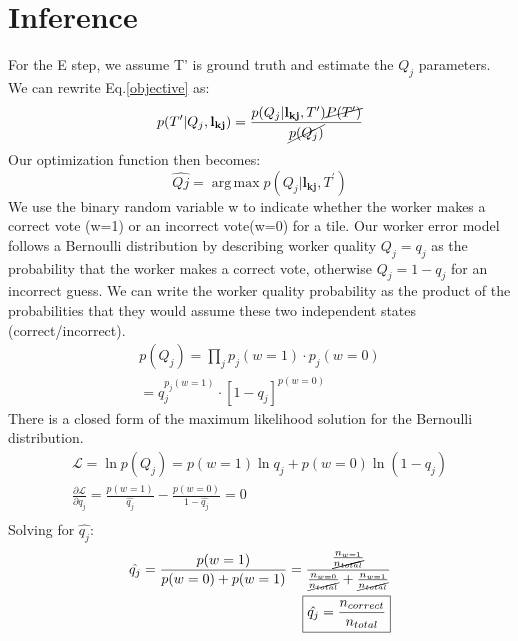 \documentclass[12pt]{article}
\DeclareMathOperator*{\argmax}{arg\,max}
\begin{document}
\section{Inference}
\par For the E step, we assume T' is ground truth and estimate the $Q_j$ parameters. We can rewrite Eq.\ref{objective} as: 
\begin{equation}
p(T^\prime| Q_j,\mathbf{l_{kj}})
=\frac{p(Q_j| \mathbf{l_{kj}},T^\prime)\cancel{P(T^\prime)}}{\cancel{p(Q_j)}}
\end{equation}
Our optimization function then becomes: 
\begin{equation}
\hat{Qj} = \argmax p(Q_j| \mathbf{l_{kj}},T^\prime)
\end{equation}
We use the binary random variable w to indicate whether the worker makes a correct vote (w=1) or an incorrect vote(w=0) for a tile. Our worker error model follows a Bernoulli distribution by describing worker quality $Q_j=q_j$ as the probability that the worker makes a correct vote, otherwise $Q_j=1-q_j$ for an incorrect guess. We can write the worker quality probability as the product of the probabilities that they would assume these two independent states (correct/incorrect). 
\begin{align}
p(Q_j) = \prod_j p_j(w=1)\cdot p_j(w=0)\\
=q_j^{p_j(w=1)}\cdot [1-q_j]^{p(w=0)}
\end{align}
There is a closed form of the maximum likelihood solution for the Bernoulli distribution.
\begin{align}
\mathcal{L}=\ln p(Q_j)=p(w=1)\ln q_j + p(w=0)\ln(1-q_j) \\
\frac{\partial \mathcal{L}}{\partial q_j}=\frac{p(w=1)}{\hat{q_j}}-\frac{p(w=0)}{1-\hat{q_j}}=0\\
\end{align}
Solving for $\hat{q_j}$: 
\begin{align}
\hat{q_j}=\frac{p(w=1)}{p(w=0)+p(w=1)}=\frac{\frac{n_{w=1}}{\cancel{n_{total}}}}{\frac{n_{w=0}}{\cancel{n_{total}}}+\frac{n_{w=1}}{\cancel{n_{total}}}}\\
\boxed{\hat{q_j}=\frac{n_{correct}}{n_{total}}}
\end{align}
\end{document}
